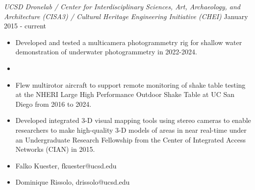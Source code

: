 \documentclass[line,margin]{res}
\begin{document}
\begin{resume}
	{\sl UCSD Dronelab / Center for Interdisciplinary Sciences, Art, Archaeology, and Architecture (CISA3) / Cultural Heritage Engineering Initiative (CHEI)} \hfill January 2015 - current
	\begin{itemize}
		\item Developed and tested a multicamera photogrammetry rig for shallow water demonstration of underwater photogrammetry in 2022-2024.
		\item 
		\item Flew multirotor aircraft to support remote monitoring of shake table testing at the NHERI Large High Performance Outdoor Shake Table at UC San Diego from 2016 to 2024.
		\item Developed integrated 3-D visual mapping tools using stereo cameras to enable researchers to make high-quality 3-D models of areas in near real-time under an Undergraduate Research Fellowship from the Center of Integrated Access Networks (CIAN) in 2015.
		\item Falko Kuester, fkuester@ucsd.edu
		\item Dominique Rissolo, drissolo@ucsd.edu
	\end{itemize}


\end{resume}
\end{document}
